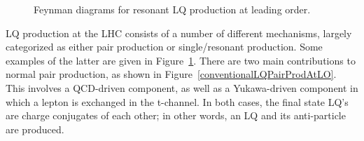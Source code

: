 \begin{figure}[t]
                
                \caption{Feynman diagrams for resonant LQ production at leading order.}
                \label{resonantLQProdAtLO}
            \end{figure}

            LQ production at the LHC consists of a number of different mechanisms, largely categorized as either pair production or single/resonant production. Some examples of the latter are given in Figure~\ref{resonantLQProdAtLO}. There are two main contributions to normal pair production, as shown in Figure~\ref{conventionalLQPairProdAtLO}. This involves a QCD-driven component, as well as a Yukawa-driven component in which a lepton is exchanged in the t-channel. In both cases, the final state LQ's are charge conjugates of each other; in other words, an LQ and its anti-particle are produced. 

